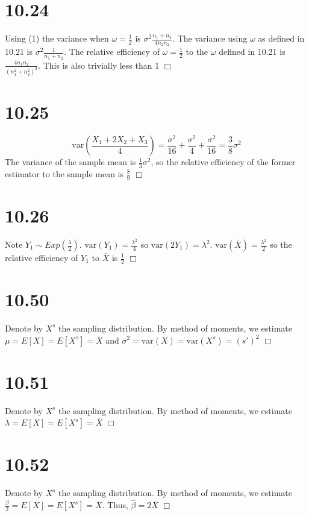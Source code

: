 \documentclass{article}
\newcommand{\var}[1]{\mathrm{var}(#1)}
\begin{document}
\section*{10.24}
Using (1) the variance when $\omega = \frac{1}{2}$ is $\sigma^2\frac{n_1+n_2}{4n_2n_2}$. The variance using $\omega$ as defined in 10.21 is $\sigma^2\frac{1}{n_1+n_2}$. The relative efficiency of $\omega = \frac{1}{2}$ to the $\omega$ defined in 10.21 is $\frac{4 n_1n_2}{\left(n_1^2 + n_2^2\right)^2}$. This is also trivially less than 1 $\Box$

\section*{10.25}
$$\var{\frac{X_1+2X_2+X_3}{4}} = \frac{\sigma^2}{16} + \frac{\sigma^2}{4} + \frac{\sigma^2}{16} = \frac{3}{8}\sigma^2$$
The variance of the sample mean is $\frac{1}{3}\sigma^2$, so the relative efficiency of the former estimator to the sample mean is $\frac{8}{9}$ $\Box$

\section*{10.26}
Note $Y_1 \sim Exp(\frac{\lambda}{2})$. $\var{Y_1} = \frac{\lambda^2}{4}$ so $\var{2Y_1} = \lambda^2$. $\var{\overline{X}} = \frac{\lambda^2}{2}$ so the relative efficiency of $Y_1$ to $\overline{X}$ is $\frac{1}{2}$ $\Box$

\section*{10.50}
Denote by $X^s$ the sampling distribution. By method of moments, we estimate $\mu = E[X] = E[X^s] = \overline{X}$ and $\sigma^2 = \var{X} = \var{X^s} = (s')^2$ $\Box$

\section*{10.51}
Denote by $X^s$ the sampling distribution. By method of moments, we estimate $\lambda = E[X] = E[X^s] = \overline{X}$ $\Box$

\section*{10.52}
Denote by $X^s$ the sampling distribution. By method of moments, we estimate $\frac{\beta}{2} = E[X] = E[X^s] = \overline{X}$. Thus, $\hat{\beta} = 2\overline{X}$ $\Box$
\end{document}
